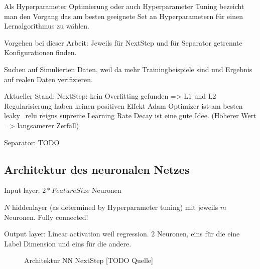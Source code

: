Als Hyperparameter Optimierung oder auch Hyperparameter Tuning bezeicht man den Vorgang das am besten geeignete Set an 
Hyperparametern für einen Lernalgorithmus zu wählen.


Vorgehen bei dieser Arbeit: Jeweils für NextStep und für Separator getrennte Konfigurationen finden.

Suchen auf Simulierten Daten, weil da mehr Trainingbeispiele sind und Ergebnis auf realen Daten verifizieren.



Aktueller Stand:
NextStep: kein Overfitting gefunden => L1 und L2 Regularisierung haben keinen positiven Effekt
Adam Optimizer ist am besten
leaky_relu reigns supreme
Learning Rate Decay ist eine gute Idee. (Höherer Wert => langsamerer Zerfall)

Separator: TODO

\subsection{Architektur des neuronalen Netzes}

Input layer: \(2 * FeatureSize\) Neuronen

\(N\) hiddenlayer (as determined by Hyperparameter tuning) mit jeweils \(m\) Neuronen.
Fully connected!

Output layer:
Linear activation weil regression.
2 Neuronen, eins für die eine Label Dimension und eins für die andere.

\begin{figure}
	\caption{Architektur NN NextStep [TODO Quelle]}
	\label{fig:netArchitecture}
\end{figure}
